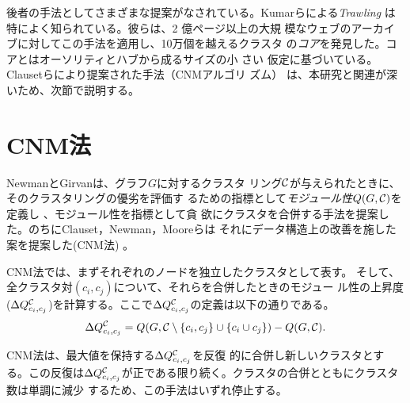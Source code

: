 \documentclass [a4j,11pt] {jsarticle}
\begin{document}
後者の手法としてさまざまな提案がなされている。Kumarらによる\emph
{Trawling} \cite{kumar-1999-trawling-the-web-for-emerging-cyber-communities}
は特によく知られている。彼らは、2 億ページ以上の大規
模なウェブのアーカイブに対してこの手法を適用し、10万個を越えるクラスタ
の\emph {コア}を発見した。コアとはオーソリティとハブから成るサイズの小
さい%
仮定に基づいている。Clausetらにより提案された手法（CNMアルゴリ
ズム）
\cite{clauset-2004-finding-community-structure-in-very-large}
は、本研究と関連が深いため、次節で説明する。


\section {CNM法}
\label {sect: cnm}

\newcommand\clustering [0] {\ensuremath {{\cal C}}}
\newcommand\DQ [3] {\ensuremath {\Delta Q^{#1}_{#2,#3}}}

NewmanとGirvanは、グラフ$G$に対するクラスタ
リング$\clustering$が与えられたときに、そのクラスタリングの優劣を評価す
るための指標として\emph {モジュール性}$Q(G,\clustering)$を定義し\cite
{newman-2004-finding-and-evaluating-community-structure-in-networks}
、モジュール性を指標として貪
欲にクラスタを合併する手法を提案した。のちにClauset，Newman，Mooreらは
それにデータ構造上の改善を施した案を提案した(CNM法)
\cite{clauset-2004-finding-community-structure-in-very-large}。

CNM法では、まずそれぞれのノードを独立したクラスタとして表す。
そして、全クラスタ対$(c_i, c_j)$について、それらを合併したときのモジュー
ル性の上昇度($\DQ \clustering {c_i} {c_j}$)を計算する。ここで$
\DQ \clustering {c_i} {c_j}$の定義は以下の通りである。
%
\[ \DQ \clustering {c_i} {c_j} =
   Q(G,\clustering \setminus \{c_i, c_j\} \cup \{c_i \cup c_j\}) -
   Q(G, \clustering). \]


CNM法は、最大値を保持する$\DQ \clustering {c_i} {c_j}$を反復
的に合併し新しいクラスタとする。この反復は$\DQ \clustering {c_i}
{c_j}$が正である限り続く。クラスタの合併とともにクラスタ数は単調に減少
するため、この手法はいずれ停止する。
\end{document}
